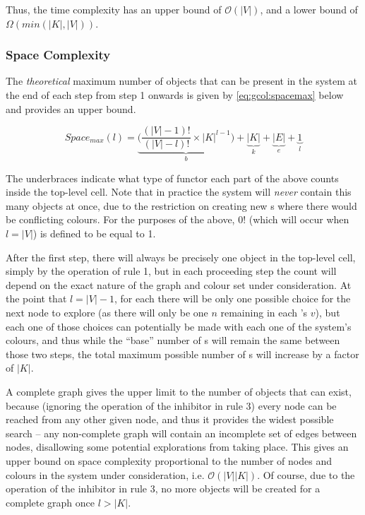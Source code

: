 Thus, the time complexity has an upper bound of \(\mathcal{O}(|V|)\), and a lower bound of \(\Omega(min(|K|, |V|))\).

\subsubsection{Space Complexity}
The \emph{theoretical} maximum number of objects that can be present in the system at the end of each step from step 1 onwards is given by \eqref{eq:gcol:spacemax} below and provides an upper bound.

\begin{equation}\label{eq:gcol:spacemax}
    Space_{max}(l) = \underbrace{\bigg(\frac{(|V| - 1)!}{(|V| - l)!} \times |K|^{l-1}\bigg)}_{b} + \underbrace{|K|}_{k} + \underbrace{|E|}_{e} + \underbrace{1}_{l}
\end{equation}

The underbraces indicate what type of functor each part of the above counts inside the top-level cell.  Note that in practice the system will \emph{never} contain this many objects at once, due to the restriction on creating new \bo{}s where there would be conflicting colours.  For the purposes of the above, \(0!\) (which will occur when \(l = |V|\)) is defined to be equal to 1.

After the first step, there will always be precisely one \bo{} object in the top-level cell, simply by the operation of rule 1, but in each proceeding step the count will depend on the exact nature of the graph and colour set under consideration.  At the point that \(l = |V| - 1\), for each \bo{} there will be only one possible choice for the next node to explore (as there will only be one \(n\) remaining in each \bo{}'s \(v\)), but each one of those choices can potentially be made with each one of the system's colours, and thus while the ``base'' number of \bo{}s will remain the same between those two steps, the total maximum possible number of \bo{}s will increase by a factor of \(|K|\).

A complete graph gives the upper limit to the number of objects that can exist, because (ignoring the operation of the inhibitor in rule 3) every node can be reached from any other given node, and thus it provides the widest possible search -- any non-complete graph will contain an incomplete set of edges between nodes, disallowing some potential explorations from taking place.  This gives an upper bound on space complexity proportional to the number of nodes and colours in the system under consideration, i.e. \(\mathcal{O}(|V||K|)\).  Of course, due to the operation of the inhibitor in rule 3, no more \bo{} objects will be created for a complete graph once \(l > |K|\).


